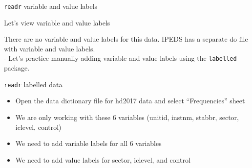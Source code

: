 \documentclass[8pt,ignorenonframetext,dvipsnames]{beamer}
\newenvironment{Shaded}{\begin{snugshade}}{\end{snugshade}}
\newcommand{\KeywordTok}[1]{\textcolor[rgb]{0.13,0.29,0.53}{\textbf{#1}}}
\newcommand{\StringTok}[1]{\textcolor[rgb]{0.31,0.60,0.02}{#1}}
\newcommand{\CommentTok}[1]{\textcolor[rgb]{0.56,0.35,0.01}{\textit{#1}}}
\newcommand{\OperatorTok}[1]{\textcolor[rgb]{0.81,0.36,0.00}{\textbf{#1}}}
\newcommand{\NormalTok}[1]{#1}
\providecommand{\tightlist}{%
  \setlength{\itemsep}{0pt}\setlength{\parskip}{0pt}}
\renewcommand{\textbf}[1]{{\color{darkgray}\bfseries\fontfamily{Montserrat-TOsF}#1}}
\begin{document}
\begin{frame}[fragile]{\texttt{readr} variable and value labels}

Let's view variable and value labels

\begin{Shaded}
\end{Shaded}

There are no variable and value labels for this data. IPEDS has a
separate do file with variable and value labels.\\
- Let's practice manually adding variable and value labels using the
\texttt{labelled} package.

\end{frame}

\begin{frame}[fragile]{\texttt{readr} labelled data}

\begin{itemize}
\tightlist
\item
  Open the data dictionary file for hd2017 data and select
  ``Frequencies'' sheet
\item
  We are only working with these 6 variables (unitid, instnm, stabbr,
  sector, iclevel, control)\\
\item
  We need to add variable labels for all 6 variables\\
\item
  We need to add value labels for sector, iclevel, and control
\end{itemize}

\begin{Shaded}
\end{Shaded}

\end{frame}
\end{document}

